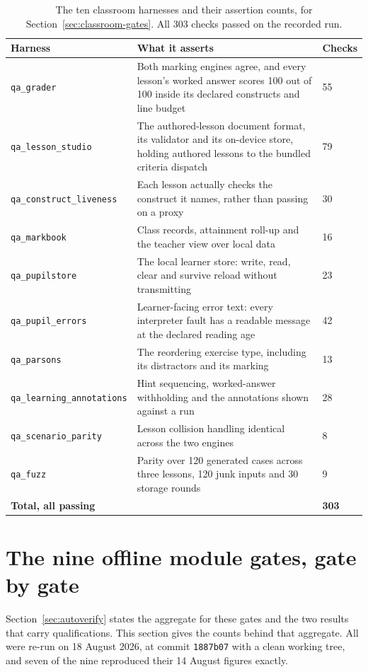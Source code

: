 \documentclass[11pt,a4paper]{report}
\begin{document}
\begin{table}[h]
\centering\small
\renewcommand{\arraystretch}{1.2}
\begin{tabular}{p{4.6cm}p{7.4cm}p{1.6cm}}
\toprule
Harness & What it asserts & Checks \\
\midrule
\texttt{qa\_grader} & Both marking engines agree, and every lesson's worked answer scores 100 out of 100 inside its declared constructs and line budget & 55 \\
\texttt{qa\_lesson\_studio} & The authored-lesson document format, its validator and its on-device store, holding authored lessons to the bundled criteria dispatch & 79 \\
\texttt{qa\_construct\_liveness} & Each lesson actually checks the construct it names, rather than passing on a proxy & 30 \\
\texttt{qa\_markbook} & Class records, attainment roll-up and the teacher view over local data & 16 \\
\texttt{qa\_pupilstore} & The local learner store: write, read, clear and survive reload without transmitting & 23 \\
\texttt{qa\_pupil\_errors} & Learner-facing error text: every interpreter fault has a readable message at the declared reading age & 42 \\
\texttt{qa\_parsons} & The reordering exercise type, including its distractors and its marking & 13 \\
\texttt{qa\_learning\_annotations} & Hint sequencing, worked-answer withholding and the annotations shown against a run & 28 \\
\texttt{qa\_scenario\_parity} & Lesson collision handling identical across the two engines & 8 \\
\texttt{qa\_fuzz} & Parity over 120 generated cases across three lessons, 120 junk inputs and 30 storage rounds & 9 \\
\midrule
\multicolumn{2}{l}{\textbf{Total, all passing}} & \textbf{303} \\
\bottomrule
\end{tabular}
\caption{The ten classroom harnesses and their assertion counts, for Section~\ref{sec:classroom-gates}. All 303 checks passed on the recorded run.}
\label{tab:classroom}
\end{table}

\section{The nine offline module gates, gate by gate}
\label{app:gates}
Section~\ref{sec:autoverify} states the aggregate for these gates and the two results that carry qualifications. This section gives the counts behind that aggregate. All were re-run on 18 August 2026, at commit \texttt{1887b07} with a clean working tree, and seven of the nine reproduced their 14 August figures exactly.
\end{document}
